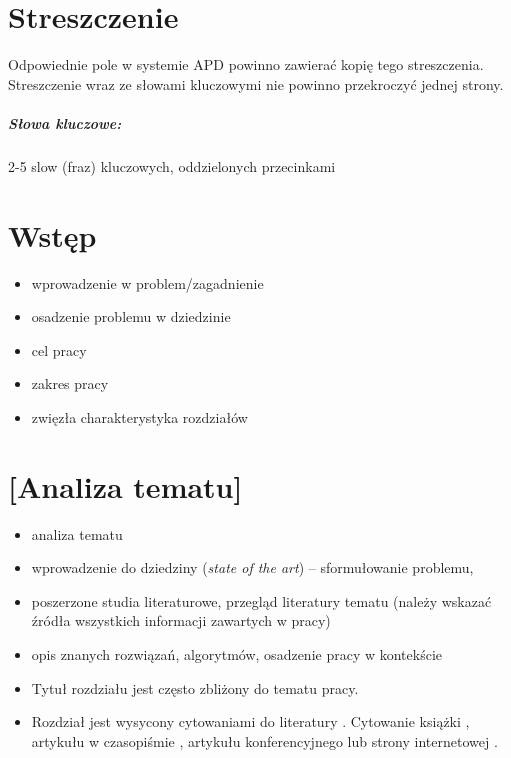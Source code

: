 \documentclass[a4paper,twoside,12pt]{book}
\newcommand{\obcy}[1]{\emph{#1}}
\newcommand{\ang}[1]{{\selectlanguage{british}\obcy{#1}}}
\newcounter{stronyPozaNumeracja}
\begin{document}
\pagestyle{tylkoNumeryStron}
\tableofcontents

\setcounter{stronyPozaNumeracja}{\value{page}}
\mainmatter


\pagestyle{empty}

\chapter*{Streszczenie}

Odpowiednie pole w systemie APD powinno zawierać kopię tego streszczenia. Streszczenie wraz ze słowami kluczowymi nie powinno przekroczyć jednej strony.

\paragraph{Słowa kluczowe:} 2-5 slow (fraz) kluczowych, oddzielonych przecinkami


\cleardoublepage

\pagestyle{NumeryStronNazwyRozdzialow}


\chapter{Wstęp}

\begin{itemize}
\item wprowadzenie w problem/zagadnienie 
\item osadzenie problemu w dziedzinie 
\item cel pracy 
\item zakres pracy 
\item zwięzła charakterystyka rozdziałów 
\end{itemize}


\chapter{[Analiza tematu]}


\begin{itemize}
\item analiza tematu
\item wprowadzenie do dziedziny (\ang{state of the art}) – sformułowanie problemu, 
\item poszerzone studia literaturowe, przegląd literatury tematu (należy wskazać źródła wszystkich informacji zawartych w pracy)
\item opis znanych rozwiązań, algorytmów, osadzenie pracy w kontekście
\item Tytuł rozdziału jest często zbliżony do tematu pracy. 
\item Rozdział jest wysycony cytowaniami do literatury \cite{bib:artykul,bib:ksiazka,bib:konferencja}. 
Cytowanie książki \cite{bib:ksiazka}, artykułu w czasopiśmie \cite{bib:artykul}, artykułu konferencyjnego \cite{bib:konferencja} lub strony internetowej \cite{bib:url}.
\end{itemize}
\end{document}
